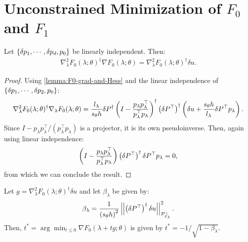 \documentclass{standalone}
\begin{document}
\section{Unconstrained Minimization of $F_0$ and $F_1$}

\begin{lemma}
  Let $\left\{\delta p_1, \cdots, \delta p_d, p_0\right\}$ be linearly
  independent. Then:
  \begin{align*}
    \nabla_\lambda^2 F_0(\lambda; \theta)^\dagger \nabla F_0(\lambda; \theta) = \nabla_\lambda^2 F_0(\lambda; \theta)^\dagger \delta u.
  \end{align*}
\end{lemma}

\begin{proof}
  Using \cref{lemma:F0-grad-and-Hess} and the linear independence
  of $\left\{\delta p_1, \cdots, \delta p_2, p_0\right\}$:
  \begin{align*}
    \nabla^2_\lambda F_0(\lambda; \theta)^\dagger \nabla_\lambda F_0(\lambda; \theta) = \frac{l_\lambda}{s_\theta h} \delta P^\dagger \left(I - \frac{p_\lambda p_\lambda^\top}{p_\lambda^\top p_\lambda}\right)^\dagger \left(\delta P^{\top}\right)^\dagger \left(\delta u + \frac{s_\theta h}{l_\lambda} \delta P^\top p_\lambda\right).
  \end{align*}
  Since $I - p_\lambda p_\lambda^\top/(p_\lambda^\top p_\lambda)$ is a
  projector, it is its own pseudoinverse. Then, again using linear
  independence:
  \begin{align*}
    \left(I - \frac{p_\lambda p_\lambda^\top}{p_\lambda^\top p_\lambda}\right) \left(\delta P^{\top}\right)^\dagger \delta P^\top p_\lambda = 0,
  \end{align*}
  from which we can conclude the result.
\end{proof}

\begin{lemma}
  Let $g = \nabla^2_\lambda F_0(\lambda; \theta)^\dagger \delta u$ and
  let $\beta_\lambda$ be given by:
  \begin{align*}
    \beta_\lambda = \frac{1}{\left(s_\theta h\right)^2} \left|\left|\left(\delta P^\top\right)^\dagger \delta u\right|\right|^2_{\mathcal{P}^\perp_{p_\lambda}}.
  \end{align*}
  Then, $t^* = \arg\min_{t \leq 0} \nabla F_0(\lambda + t g; \theta)$
  is given by $t^* = -1/\sqrt{1 - \beta_\lambda}$.
\end{lemma}
\end{document}
